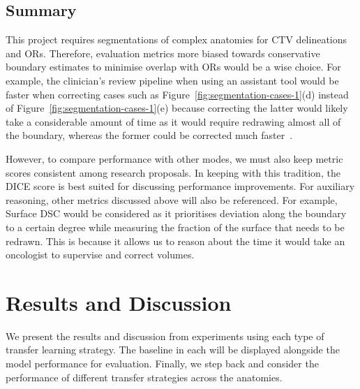 \documentclass[11pt,twoside]{report}
\begin{document}


\section{Summary}


This project requires segmentations of complex anatomies for CTV delineations and ORs. Therefore, evaluation metrics more biased towards conservative boundary estimates to minimise overlap with ORs would be a wise choice. For example, the clinician's review pipeline when using an assistant tool would be faster when correcting cases such as Figure~\ref{fig:segmentation-cases-1}(d) instead of Figure~\ref{fig:segmentation-cases-1}(e) because correcting the latter would likely take a considerable amount of time as it would require redrawing almost all of the boundary, whereas the former could be corrected much faster~\cite{Nikolov2021-xe}.

However, to compare performance with other modes, we must also keep metric scores consistent among research proposals. In keeping with this tradition, the DICE score is best suited for discussing performance improvements. For auxiliary reasoning, other metrics discussed above will also be referenced. For example, Surface DSC would be considered as it prioritises deviation along the boundary to a certain degree while measuring the fraction of the surface that needs to be redrawn. This is because it allows us to reason about the time it would take an oncologist to supervise and correct volumes.

\chapter{Results and Discussion}\label{sect:results}\label{sect:discussion}

We present the results and discussion from experiments using each type of transfer learning strategy. The baseline in each will be displayed alongside the model performance for evaluation. Finally, we step back and consider the performance of different transfer strategies across the anatomies.
\end{document}

